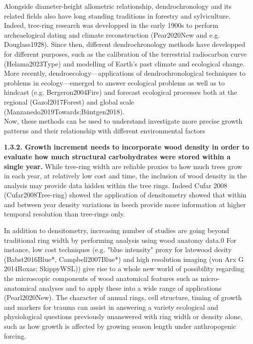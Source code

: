 \documentclass{article}
\begin{document}
Alongside diameter-height allometric relationship, dendrochronology and its related fields also have long standing traditions in forestry and sylviculture. Indeed, tree-ring research was developped in the early 1900s to perform archeaelogical dating and climate reconstruction (Pear2020New and e.g. Douglass1928). Since then, different dendrochronology methods have developped for different purposes, such as the calibration of the terrestrial radiocarbon curve (Helama2023Type) and modelling of Earth's past climate and ecological change. More recently, dendroecology---applications of dendrochronological techniques to problems in ecology---emerged to answer ecological problems as well as to hindcast (e.g. Bergeron2004Fire) and forecast ecological processes both at the regional (Gazol2017Forest) and global scale (Manzanedo2019Towards;Büntgen2018). \\

Now, these methods can be used to understand investigate more precise growth patterns and their relationship with different environmental factors

\textbf{1.3.2. Growth increment needs to incorporate wood density in order to evaluate how much structural carbohydrates were stored within a single year.}
While tree-ring width are reliable proxies to how much trees grow in each year, at relatively low cost and time, the inclusion of wood density in the analysis may provide data hidden within the tree rings. Indeed Cufar 2008 (Cufar2008Tree-ring) showed the application of densitometry showed that within and between year density variations in beech provide more information at higher temporal resolution than tree-rings only. 

In addition to densitometry, increasing number of studies are going beyond traditional ring width by performing analysis using wood anatomy data.0 For instance, low cost techniques (e.g. "blue intensity" proxy for latewood desity (Babst2016Blue*, Campbell2007Blue*) and high resolution imaging (von Arx G 2014Roxas; SkippyWSL)) give rise to a whole new world of possibility regarding the microscopic components of wood anatomical features such as micro-anatomical analyses and to apply these into a wide range of applications (Pearl2020New). The character of annual rings, cell structure, timing of growth and markers for trauma can assist in answering a variety ecological and physiological questions previously unanswered with ring width or density alone, such as how growth is affected by growing season length under anthropogenic forcing.
\end{document}
